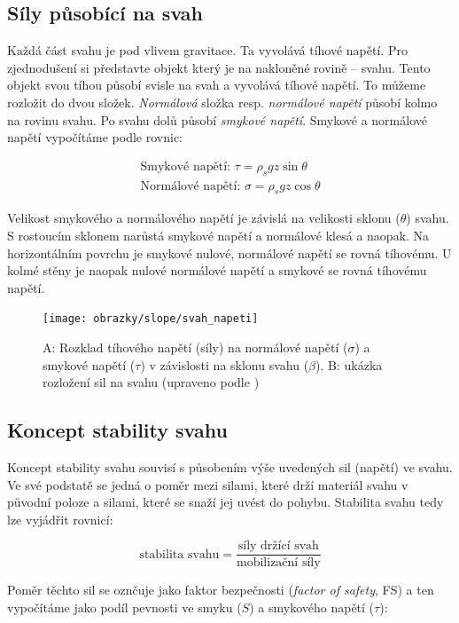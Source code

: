 \subsection{Síly působící na svah}
Každá část svahu je pod vlivem gravitace. Ta vyvolává tíhové napětí. Pro zjednodušení si představte objekt který je na nakloněné rovině -- svahu. Tento objekt svou tíhou působí svisle na svah a vyvolává tíhové napětí. To můžeme rozložit do dvou složek. \emph{Normálová} složka resp. \emph{normálové napětí} působí kolmo na rovinu svahu. Po svahu dolů působí \emph{smykové napětí}. Smykové a normálové napětí vypočítáme podle rovnic:

\begin{align}
\text{Smykové napětí: }	\tau = \rho_{s}gz\sin{\theta}\\
\text{Normálové napětí: }	\sigma = \rho_{s}gz\cos{\theta}
\end{align}

Velikost smykového a normálového napětí je závislá na velikosti sklonu ($\theta$) svahu. S rostoucím sklonem narůstá smykové napětí a normálové klesá a naopak. Na horizontálním povrchu je smykové nulové, normálové napětí se rovná tíhovému. U kolmé stěny je naopak nulové normálové napětí a smykové se rovná tíhovému napětí.

\begin{figure}[h]
	\centering
	\texttt{[image: obrazky/slope/svah\_napeti]}
	\caption{A: Rozklad tíhového napětí (síly) na normálové napětí ($\sigma$) a smykové napětí ($\tau$) v závislosti na sklonu svahu ($\beta$). B: ukázka rozložení sil na svahu (upraveno podle \textcite{selbyHillslopeMaterialsProcesses1993})}
	\label{fig:svahnapeti}
\end{figure}

\subsection{Koncept stability svahu}
Koncept stability svahu souvisí s působením výše uvedených sil (napětí) ve svahu. Ve své podstatě se jedná o poměr mezi silami, které drží materiál svahu v původní poloze a silami, které se snaží jej uvést do pohybu. Stabilita svahu tedy lze vyjádřit rovnicí:

\begin{equation}
\text{stabilita svahu} = \frac{\text{síly držící svah}}{\text{mobilizační síly}}	
\end{equation}

Poměr těchto sil se oznčuje jako faktor bezpečnosti (\textit{factor of safety}, FS) a ten vypočítáme jako podíl pevnosti ve smyku ($S$) a smykového napětí ($\tau$):

